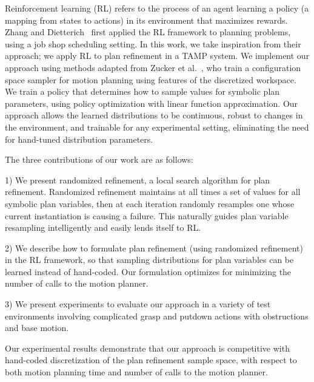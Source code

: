 Reinforcement learning (RL) refers to the process of an agent learning a policy (a mapping from states to actions)
in its environment that maximizes rewards. Zhang and Dietterich~\cite{JobShopSched} first applied the RL framework
to planning problems, using a job shop scheduling setting. In this work, we take inspiration from
their approach; we apply RL to plan refinement in a TAMP system. We implement our approach using methods adapted from
Zucker et al.~\cite{workspacebias}, who train a configuration space sampler for motion planning
using features of the discretized workspace. We train a policy that
determines how to sample values for symbolic plan parameters, using policy optimization with linear function
approximation. Our approach allows the learned distributions to be continuous, robust to changes in
the environment, and trainable for any experimental setting, eliminating the need for hand-tuned
distribution parameters.

The three contributions of our work are as follows:
\begin{tightlist}
\item[1)] We present randomized refinement,
a local search algorithm for plan refinement. Randomized refinement maintains at
all times a set of values for all symbolic plan variables, then at each iteration randomly
resamples one whose current instantiation is causing a failure. This naturally guides
plan variable resampling intelligently and easily lends itself to RL.
\item[2)] We describe how to formulate plan refinement (using randomized
refinement) in the RL framework, so that sampling
distributions for plan variables can be learned instead of hand-coded. Our formulation optimizes for
minimizing the number of calls to the motion planner.
\item[3)] We present experiments to evaluate our approach
in a variety of test environments involving complicated grasp and putdown
actions with obstructions and base motion.
\end{tightlist}
Our experimental results demonstrate that our approach is competitive with hand-coded discretization
of the plan refinement sample space, with respect to both motion planning time and number of calls
to the motion planner.